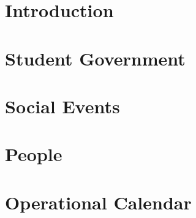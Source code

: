 


\chapter{Introduction}\label{intro}


\chapter{Student Government}\label{government}


\chapter{Social Events}\label{events}


\chapter{People}\label{people}


\chapter{Operational Calendar}\label{opcal}
















